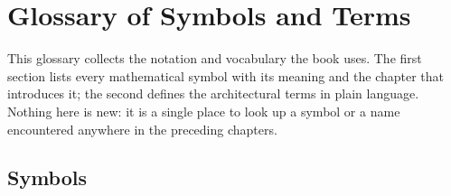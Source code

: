 \chapter{Glossary of Symbols and Terms}
\label{ch:glossary}

This glossary collects the notation and vocabulary the book uses. The first section
lists every mathematical symbol with its meaning and the chapter that introduces it;
the second defines the architectural terms in plain language. Nothing here is new: it
is a single place to look up a symbol or a name encountered anywhere in the preceding
chapters.

\section{Symbols}
\label{sec:glossary-symbols}

